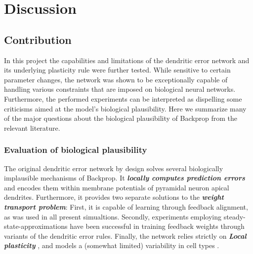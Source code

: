 
\chapter{Discussion}


\section{Contribution}

In this project the capabilities and limitations of the dendritic error network and its underlying plasticity rule were
further tested. While sensitive to certain parameter changes, the network was shown to be exceptionally capable of
handling various constraints that are imposed on biological neural networks. Furthermore, the performed experiments can
be interpreted as dispelling some criticisms aimed at the model's biological plausibility. Here we summarize many of the
major questions about the biological plausibility of Backprop from the relevant literature.


\subsection*{Evaluation of biological plausibility}

The original dendritic error network by design solves several biologically implausible mechanisms of Backprop. It
\textit{\textbf{locally computes prediction errors}} and encodes them within membrane potentials of pyramidal neuron
apical dendrites. Furthermore, it provides two separate solutions to the \textit{\textbf{weight transport problem}}:
First, it is capable of learning through feedback alignment, as was used in all present simualtions. Secondly,
experiments employing steady-state-approximations have been successful in training feedback weights through variants of
the dendritic error rules. Finally, the network relies strictly on \textit{\textbf{Local plasticity}}
\citep{Whittington2017}, and models a (somewhat limited) variability in cell types \citep{Bartunov2018}.\newline

